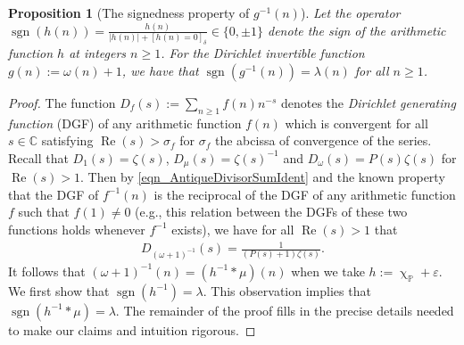 \documentclass[11pt,reqno,a4letter]{article}
\numberwithin{figure}{section}
\numberwithin{table}{section}
\newcommand{\Iverson}[1]{\ensuremath{\left[#1\right]_{\delta}}}
\renewcommand{\chi}{\upchi}
\theoremstyle{plain}
\newtheorem{prop}[theorem]{Proposition}
\numberwithin{theorem}{section}
\theoremstyle{definition}
\newcommand{\NBRef}[1]{}
\renewcommand{\Re}{\operatorname{Re}}
\begin{document}
\begin{prop}[The signedness property of $g^{-1}(n)$]
\label{prop_SignageDirInvsOfPosBddArithmeticFuncs_v1} 
Let the operator 
$\operatorname{sgn}(h(n)) = \frac{h(n)}{|h(n)| + \Iverson{h(n) = 0}} \in \{0, \pm 1\}$ denote the sign 
of the arithmetic function $h$ at integers $n \geq 1$. 
For the Dirichlet invertible function $g(n) := \omega(n) + 1$, 
we have that $\operatorname{sgn}(g^{-1}(n)) = \lambda(n)$ for all $n \geq 1$. 
\NBRef{A02-2020-04-26}
\end{prop} 
\begin{proof} 
The function $D_f(s) := \sum_{n \geq 1} f(n) n^{-s}$ denotes the 
\emph{Dirichlet generating function} (DGF) of any 
arithmetic function $f(n)$ which is convergent for all $s \in \mathbb{C}$ satisfying 
$\Re(s) > \sigma_f$ for $\sigma_f$ the abcissa of convergence of the series. 
Recall that $D_1(s) = \zeta(s)$, $D_{\mu}(s) = \zeta(s)^{-1}$ and $D_{\omega}(s) = P(s) \zeta(s)$ for 
$\Re(s) > 1$. 
Then by \eqref{eqn_AntiqueDivisorSumIdent} and the known property that the DGF of $f^{-1}(n)$ is 
the reciprocal of the DGF of any arithmetic function $f$ such that $f(1) \neq 0$ 
(e.g., this relation between the DGFs of these two functions holds whenever $f^{-1}$ exists), 
we have for all $\Re(s) > 1$ that 
\begin{align} 
\label{eqn_DGF_of_gInvn} 
D_{(\omega+1)^{-1}}(s) = \frac{1}{(P(s)+1) \zeta(s)}. 
\end{align} 
It follows that $(\omega + 1)^{-1}(n) = (h^{-1} \ast \mu)(n)$ when we take 
$h := \chi_{\mathbb{P}} + \varepsilon$. 
We first show that $\operatorname{sgn}(h^{-1}) = \lambda$. 
This observation implies 
that $\operatorname{sgn}(h^{-1} \ast \mu) = \lambda$. The remainder of the proof fills in the 
precise details needed to make our claims and intuition rigorous. 


\end{proof}
\end{document}
